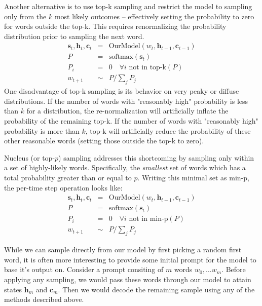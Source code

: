 \documentclass[a4paper,10pt]{article}
\begin{document}
 Another alternative is to use top-k sampling and restrict the model to sampling only from the $k$ most likely outcomes -- effectively setting the probability to zero for words outside the top-k. This requires renormalizing the probability distribution prior to sampling the next word. 
%
\begin{eqnarray}
\mathbf{s}_t, \mathbf{h}_{t}, \mathbf{c}_{t} &=& \mbox{OurModel}\left(w_{t}, \mathbf{h}_{t-1}, \mathbf{c}_{t-1}\right)\\
P &=& \mbox{softmax}(\mathbf{s}_t)\\
P_i &=& 0\quad\forall i \mbox{ not in top-k}(P)\\
w_{t+1} &\sim& P / \sum_j P_j
\end{eqnarray}
%
One disadvantage of top-k sampling is its behavior on very peaky or diffuse distributions. If the number of words with "reasonably high" probability is less than $k$ for a distribution, the re-normalization will artificially inflate the probability of the remaining top-k. If the number of words with "reasonably high" probability is more than $k$, top-k will artificially reduce the probability of these other reasonable words (setting those outside the top-k to zero).

 Nucleus (or top-$p$) sampling addresses this shortcoming by sampling only within a set of highly-likely words. Specifically, the \emph{smallest} set of words which has a total probability greater than or equal to $p$. Writing this minimal set as min-p, the per-time step operation looks like: 
%
\begin{eqnarray}
\mathbf{s}_t, \mathbf{h}_{t}, \mathbf{c}_{t} &=& \mbox{OurModel}\left(w_{t}, \mathbf{h}_{t-1}, \mathbf{c}_{t-1}\right)\\
P &=& \mbox{softmax}(\mathbf{s}_t)\\
P_i &=& 0\quad\forall i \mbox{ not in min-p}(P)\\
w_{t+1} &\sim& P / \sum_j P_j
\end{eqnarray}
%

 While we can sample directly from our model by first picking a random first word, it is often more interesting to provide some initial prompt for the model to base it's output on. Consider a prompt consiting of $m$ words $w_0, \dots w_m$. Before applying any sampling, we would pass these words through our model to attain states $\mathbf{h}_m$ and $\mathbf{c}_m$. Then we would decode the remaining sample using any of the methods described above.
\end{document}
